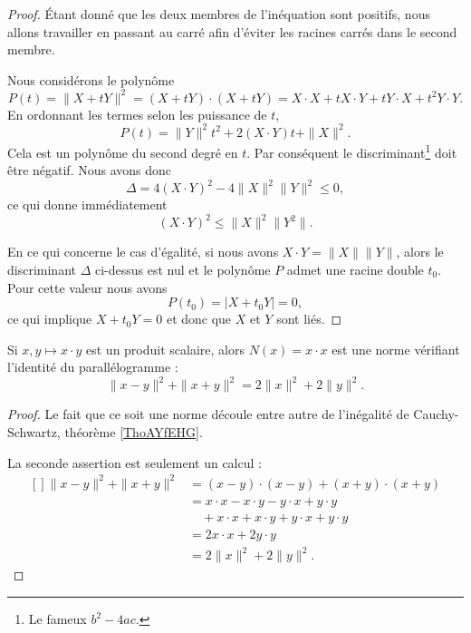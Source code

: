 \begin{proof}
	Étant donné que les deux membres de l'inéquation sont positifs, nous allons travailler en passant au carré afin d'éviter les racines carrés dans le second membre.

	Nous considérons le polynôme
	\begin{equation}
		P(t)=\| X+tY \|^2=(X+tY)\cdot(X+tY)=X\cdot X+tX\cdot Y+tY\cdot X+t^2Y\cdot Y.
	\end{equation}
	En ordonnant les termes selon les puissance de $t$,
	\begin{equation}
		P(t)=\| Y \|^2t^2+2(X\cdot Y)t+\| X \|^2.
	\end{equation}
	Cela est un polynôme du second degré en $t$. Par conséquent le discriminant\footnote{Le fameux $b^2-4ac$.} doit être négatif. Nous avons donc
	\begin{equation}
		\Delta=4(X\cdot Y)^2-4\| X \|^2\| Y \|^2\leq 0,
	\end{equation}
	ce qui donne immédiatement
	\begin{equation}
		(X\cdot Y)^2\leq\| X \|^2\| Y^2 \|.
	\end{equation}

    En ce qui concerne le cas d'égalité, si nous avons \( X\cdot Y=\| X \|\| Y \|\), alors le discriminant \( \Delta\) ci-dessus est nul et le polynôme \( P\) admet une racine double \( t_0\). Pour cette valeur nous avons
    \begin{equation}
        P(t_0)=| X+t_0Y |=0,
    \end{equation}
    ce qui implique \( X+t_0Y=0\) et donc que \( X\) et \( Y\) sont liés.
\end{proof}

\begin{proposition}
    Si \( x,y\mapsto x\cdot y\) est un produit scalaire, alors \( N(x)=x\cdot x\) est une norme vérifiant l'identité du parallélogramme :
    \begin{equation}        \label{EqYCLtWfJ}
        \| x-y \|^2+\| x+y \|^2=2\| x \|^2+2\| y \|^2.
    \end{equation}
\end{proposition}

\begin{proof}
    Le fait que ce soit une norme découle entre autre de l'inégalité de Cauchy-Schwartz, théorème \ref{ThoAYfEHG}.

    La seconde assertion est seulement un calcul :
			\begin{equation}
				\begin{aligned}[]
					\| x-y \|^2+\| x+y \|^2&=(x-y)\cdot (x-y)+(x+y)\cdot(x+y)\\
					&=x\cdot x-x\cdot y-y\cdot x+y\cdot y\\
					&\quad +x\cdot x+x\cdot y+y\cdot x+y\cdot y\\
					&=2x\cdot x+2y\cdot y\\
					&=2\| x \|^2+2\| y \|^2.
				\end{aligned}
			\end{equation}
\end{proof}


